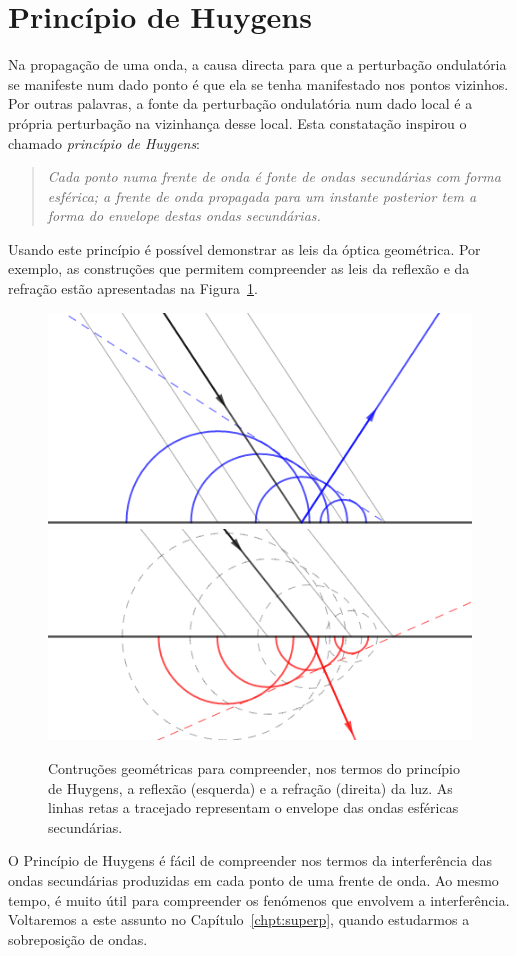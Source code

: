 \section{Princípio de Huygens}
\label{sec:huygens}
Na propagação de uma onda, a causa directa para que a perturbação ondulatória se
manifeste num dado ponto é que ela se tenha manifestado nos pontos vizinhos. Por
outras palavras, a fonte da perturbação ondulatória num dado local é a própria
perturbação na vizinhança desse local. Esta constatação inspirou o chamado
\emph{princípio de Huygens}:
\begin{quote}
    \textsl{Cada ponto numa frente de onda é fonte de ondas secundárias com
    forma esférica; a frente de onda propagada para um instante posterior tem a
    forma do envelope destas ondas secundárias.}
\end{quote}
Usando este princípio é possível demonstrar as leis da óptica geométrica. Por
exemplo, as construções que permitem compreender as leis da reflexão e da
refração estão apresentadas na Figura~\ref{fig:f060}.
\begin{figure}[htb]
\begin{center}
\includegraphics[width=0.45\linewidth]{figs/huygens_reflection.png}\hfill
\includegraphics[width=0.45\linewidth]{figs/huygens_refraction.png}
\end{center}
\caption{Contruções geométricas para compreender, nos termos do princípio de
Huygens, a reflexão (esquerda) e a refração (direita) da luz. As linhas retas a
tracejado representam o envelope das ondas esféricas
secundárias.\label{fig:f060}}
\end{figure}

O Princípio de Huygens é fácil de compreender nos termos da interferência das
ondas secundárias produzidas em cada ponto de uma frente de onda. Ao mesmo
tempo, é muito útil para compreender os fenómenos que envolvem a interferência.
Voltaremos a este assunto no Capítulo~\ref{chpt:superp}, quando estudarmos a
sobreposição de ondas.


